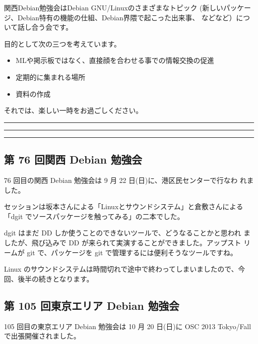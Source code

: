 \documentclass[mingoth,a4paper]{jsarticle}
\begin{document}
 関西Debian勉強会はDebian GNU/Linuxのさまざまなトピック
 (新しいパッケージ、Debian特有の機能の仕組、Debian界隈で起こった出来事、
 などなど）について話し合う会です。

 目的として次の三つを考えています。
 \begin{itemize}
  \item MLや掲示板ではなく、直接顔を合わせる事での情報交換の促進
  \item 定期的に集まれる場所
  \item 資料の作成
 \end{itemize}

 それでは、楽しい一時をお過ごしください。

\newpage

\begin{minipage}[b]{0.2\hsize}
 {}
\end{minipage}
\begin{minipage}[b]{0.8\hsize}
\hrule
\vspace{2mm}
\hrule
\setcounter{tocdepth}{1}
\tableofcontents
\vspace{2mm}
\hrule
\end{minipage}


\subsection{第 76 回関西 Debian 勉強会}

76 回目の関西 Debian 勉強会は 9 月 22 日(日)に、港区民センターで行なわ
れました。

セッションは坂本さんによる「Linuxとサウンドシステム」と倉敷さんによる
「dgit でソースパッケージを触ってみる」の二本でした。

dgit はまだ DD しか使うことのできないツールで、どうなることかと思われ
ましたが、飛び込みで DD が来られて実演することができました。アップスト
リームが git で、パッケージを git で管理するには便利そうなツールですね。

Linux のサウンドシステムは時間切れで途中で終わってしまいましたので、今
回、後半の続きとなります。

\subsection{第 105 回東京エリア Debian 勉強会}

105 回目の東京エリア Debian 勉強会は 10 月 20 日(日)に OSC 2013
Tokyo/Fall で出張開催されました。
\end{document}
